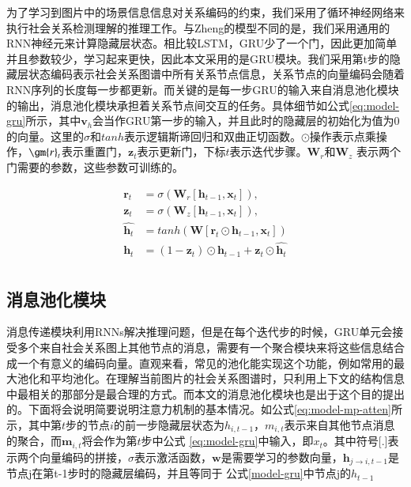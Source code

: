 为了学习到图片中的场景信息信息对关系编码的约束，我们采用了循环神经网络来执行社会关系检测理解的推理工作。与Zheng\cite{zheng2015conditional}的模型不同的是，我们采用通用的RNN神经元来计算隐藏层状态。相比较LSTM，GRU少了一个门，因此更加简单并且参数较少，学习起来更快，因此本文采用的是GRU模块。我们采用第t步的隐藏层状态编码表示社会关系图谱中所有关系节点信息，关系节点的向量编码会随着RNN序列的长度每一步都更新。而关键的是每一步GRU的输入来自消息池化模块的输出，消息池化模块承担着关系节点间交互的任务。具体细节如公式\ref{eq:model-gru}所示，其中$\mathbf{v}_h$会当作GRU第一步的输入，并且此时的隐藏层的初始化为值为0的向量。这里的$\sigma$和$tanh$表示逻辑斯谛回归和双曲正切函数。$\bm{\odot}$操作表示点乘操作，$\gm{r}_t$表示重置门，$\bm{z}_t$表示更新门，下标$t$表示迭代步骤。$\mathbf{W}_r$和$\mathbf{W}_z$ 表示两个门需要的参数，这些参数可训练的。

\begin{equation} \label{eq:model-gru}
\begin{split}
\bm{r}_t &=  \sigma(\bm{W}_{r}[\bm{h}_{t-1}, \bm{x}_t]), \\
\bm{z}_t &=  \sigma(\bm{W}_{z}[\bm{h}_{t-1}, \bm{x}_t]), \\
\hat{\bm{h}_t} &= tanh(\bm{W}[\bm{r}_t \odot \bm{h}_{t-1}, \bm{x}_{t}])\\
\bm{h}_t &= (1 - \bm{z}_t) \odot \bm{h}_{t - 1} + \bm{z}_t \odot \hat{\bm{h}_t} \\
\end{split}
\end{equation}

\subsection{消息池化模块}

消息传递模块利用RNNs解决推理问题，但是在每个迭代步的时候，GRU单元会接受多个来自社会关系图上其他节点的消息，需要有一个聚合模块来将这些信息结合成一个有意义的编码向量。直观来看，常见的池化能实现这个功能，例如常用的最大池化和平均池化。在理解当前图片的社会关系图谱时，只利用上下文的结构信息中最相关的那部分是最合理的方式。而本文的消息池化模块也是出于这个目的提出的。下面将会说明简要说明注意力机制的基本情况。如公式\ref{eq:model-mp-atten}所示，其中第$t$步的节点$i$的前一步隐藏层状态为$h_{i,t-1}$，$m_{i,t}$表示来自其他节点消息的聚合，而$\bm{m}_{i,t}$将会作为第$t$步中公式
\ref{eq:model-gru}中输入，即$x_{t}$。其中符号[.]表示两个向量编码的拼接，$\sigma$表示激活函数，$\bm{w}$是需要学习的参数向量，$\bm{h}_{j \to i,t-1}$是节点j在第t-1步时的隐藏层编码，并且等同于
公式\ref{model-gru}中节点j的$h_{t-1}$

